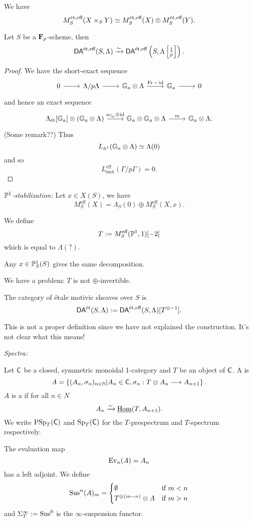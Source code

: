 We have
\[
M_S^{\text{\'et},\text{eff}}(X\times_S Y) \isoto M_S^{\text{\'et},\text{eff}}(X) \otimes
M_S^{\text{\'et},\text{eff}}(Y).
\]
\begin{proposition}
Let $S$ be a $\F_p$-scheme, then
\[
\cat{DA}^{\text{\'et},\text{eff}}(S,\Lambda) \simto
\cat{DA}^{\text{\'et},\text{eff}}\left( S,\Lambda\left[ \tfrac{1}{p} \right]  \right) .
\]
\end{proposition}
\begin{proof}
We have the short-exact sequence
\[
\begin{tikzcd}
0 \ar[r] & \Lambda / p\Lambda \ar[r] & \Ga \otimes \Lambda \ar[r,"\Fr-\id"] & \Ga \ar[r] & 0
\end{tikzcd}
\]
and hence an exact sequence
\[
\begin{tikzcd}
\Lambda_{\text{\'et}}[\Ga] \otimes(\Ga\otimes \Lambda) \ar[r,"a_{\Ga}\otimes \id"] &
\Ga\otimes \Ga\otimes \Lambda \ar[r,"m"] & \Ga\otimes \Lambda.
\end{tikzcd}
\]
(Some remark??) Thus
\[
L_{\Aff^{1}}(\Ga\otimes\Lambda) \isoto \Lambda(0)
\]
and so
\[
L_{\text{mot}}^{\text{eff}}(\Gamma /p\Gamma) = 0.
\]
\end{proof}

\emph{$\P^{1}$-stabilization:} Let $x\in X(S)$, we have
\[
M_S^{\text{eff}}(X) = \Lambda_S(0) \oplus M_{S}^{\text{eff}}(X,x).
\]
\begin{definition}
We define
\[
T \defeq M_S^{\text{eff}}(\P^{1},1)[-2]
\]
which is equal to $\Lambda(?).$
\end{definition}
\begin{exercise}
Any $x\in \P^{1}_S(S)$ gives the same decomposition.
\end{exercise}
We have a problem: $T$ is not $\oplus$-invertible.

\begin{definition}
The category of \'etale motivic sheaves over $S$ is
\[
\DAet(S,\Lambda) \defeq \cat{DA}^{\text{\'et},\text{eff}}(S,\Lambda)[T^{\otimes -1}].
\]
\end{definition}
This is not a proper definition since we have not explained the construction. It's not
clear what this means!

\emph{Spectra:}
\begin{definition}
Let $\C$ be a closed, symmetric monoidal 1-category and $T$ be an object of $\C$. A
 is
\[
A = \left\{ (A_n,\sigma_n)_{n\in \N} | A_n\in \C, \sigma_n:T\otimes A_n\to A_{n+1} \right\} .
\]
$A$ is a  if for all $n\in N$
\[
A_n \simto \iHom(T,A_{n+1}).
\]
We write $\PSp_T(\C)$ and $\Sp_T(\C)$ for the $T$-prespectrum and $T$-spectrum respectively.
\end{definition}
The evaluation map
\[
\Ev_n(A) = A_n
\]
has a left adjoint. We define
\[
\Sus^{n}(A)_m =
\begin{cases}
\emptyset & \text{if }m<n \\
T^{\otimes (m-n)}\otimes A & \text{if }m>n
\end{cases}
\]
and $\Sigma_T^{\infty}\defeq \Sus^{0}$ is the $\infty$-suspension functor.

